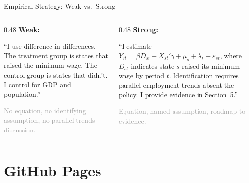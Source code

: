 \begin{frame}{Empirical Strategy: Weak vs.\ Strong}
  \footnotesize
  \begin{columns}[T]
    \begin{column}{0.48\textwidth}
      \textbf{\textcolor{red!60}{Weak:}}

      \vspace{2pt}

      ``I use difference-in-differences. The treatment group is states that raised the minimum wage. The control group is states that didn't. I control for GDP and population.''

      \vspace{4pt}

      {\scriptsize \textcolor{darkgray}{No equation, no identifying assumption, no parallel trends discussion.}}
    \end{column}
    \begin{column}{0.48\textwidth}
      \textbf{\textcolor{usfgreen}{Strong:}}

      \vspace{2pt}

      ``I estimate $Y_{st} = \beta D_{st} + X_{st}'\gamma + \mu_s + \lambda_t + \varepsilon_{st}$, where $D_{st}$ indicates state $s$ raised its minimum wage by period $t$. Identification requires parallel employment trends absent the policy. I provide evidence in Section~5.''

      \vspace{4pt}

      {\scriptsize \textcolor{darkgray}{Equation, named assumption, roadmap to evidence.}}
    \end{column}
  \end{columns}
\end{frame}

\section{GitHub Pages}

